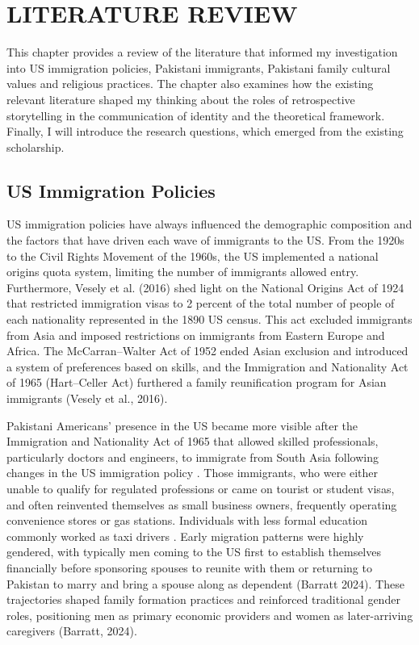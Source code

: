 \chapter{\texorpdfstring{LITERATURE REVIEW}{}} %

This chapter provides a review of the literature that informed my investigation into US immigration policies, Pakistani immigrants, Pakistani family cultural values and religious practices. The chapter also examines how the existing relevant literature shaped my thinking about the roles of retrospective storytelling in the communication of identity and the theoretical framework. Finally, I will introduce the research questions, which emerged from the existing scholarship.

\section{US Immigration Policies}

US immigration policies have always influenced the demographic composition and the factors that have driven each wave of immigrants to the US. From the 1920s to the Civil Rights Movement of the 1960s, the US implemented a national origins quota system, limiting the number of immigrants allowed entry. Furthermore, \citet{} Vesely et al. (2016) shed light on the National Origins Act of 1924 that restricted immigration visas to 2 percent of the total number of people of each nationality represented in the 1890 US census. This act excluded immigrants from Asia and imposed restrictions on immigrants from Eastern Europe and Africa. The McCarran–Walter Act of 1952 ended Asian exclusion and introduced a system of preferences based on skills, and the Immigration and Nationality Act of 1965 (Hart–Celler Act) furthered a family reunification program for Asian immigrants \citep{batalovaImmigrationDataMatters2020} (Vesely et al., 2016).

Pakistani Americans’ presence in the US became more visible after the Immigration and Nationality Act of 1965 that allowed skilled professionals, particularly doctors and engineers, to immigrate from South Asia following changes in the US immigration policy \citep{batalovaImmigrationDataMatters2020, ghaniPakistaniMigrantsUnited2016, PakistaniImmigrantsSocial}. Those immigrants, who were either unable to qualify for regulated professions or came on tourist or student visas, and often reinvented themselves as small business owners, frequently operating convenience stores or gas stations. Individuals with less formal education commonly worked as taxi drivers \citep{PakistaniImmigrantsSocial}. Early migration patterns were highly gendered, with typically men coming to the US first to establish themselves financially before sponsoring spouses to reunite with them  or returning to Pakistan to marry and bring a spouse along as dependent (Barratt 2024). These trajectories shaped family formation practices and reinforced traditional gender roles, positioning men as primary economic providers and women as later-arriving caregivers \citep{chaudharyTaleTwoGenerations2024, PakistaniImmigrantsSocial} (Barratt, 2024).

